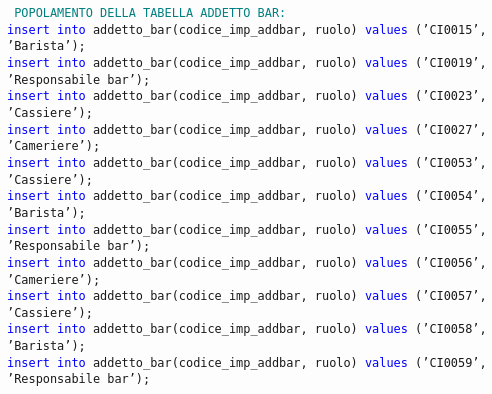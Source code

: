 \documentclass{article}
\begin{document}
    \begin{flushleft}
        \texttt{
        \textcolor{teal}{POPOLAMENTO DELLA TABELLA ADDETTO BAR:} \\
        \hspace*{0.5em}\textcolor{blue}{insert into} addetto\_bar(codice\_imp\_addbar, ruolo) \textcolor{blue}{values} ('CI0015', 'Barista'); \\
        \hspace*{0.5em}\textcolor{blue}{insert into} addetto\_bar(codice\_imp\_addbar, ruolo) \textcolor{blue}{values} ('CI0019', 'Responsabile \hspace*{0.5em}bar'); \\
        \hspace*{0.5em}\textcolor{blue}{insert into} addetto\_bar(codice\_imp\_addbar, ruolo) \textcolor{blue}{values} ('CI0023', 'Cassiere'); \\
        \hspace*{0.5em}\textcolor{blue}{insert into} addetto\_bar(codice\_imp\_addbar, ruolo) \textcolor{blue}{values} ('CI0027', 'Cameriere'); \\
        \hspace*{0.5em}\textcolor{blue}{insert into} addetto\_bar(codice\_imp\_addbar, ruolo) \textcolor{blue}{values} ('CI0053', 'Cassiere'); \\
        \hspace*{0.5em}\textcolor{blue}{insert into} addetto\_bar(codice\_imp\_addbar, ruolo) \textcolor{blue}{values} ('CI0054', 'Barista'); \\
        \hspace*{0.5em}\textcolor{blue}{insert into} addetto\_bar(codice\_imp\_addbar, ruolo) \textcolor{blue}{values} ('CI0055', 'Responsabile \hspace*{0.5em}bar'); \\
        \hspace*{0.5em}\textcolor{blue}{insert into} addetto\_bar(codice\_imp\_addbar, ruolo) \textcolor{blue}{values} ('CI0056', 'Cameriere'); \\
        \hspace*{0.5em}\textcolor{blue}{insert into} addetto\_bar(codice\_imp\_addbar, ruolo) \textcolor{blue}{values} ('CI0057', 'Cassiere'); \\
        \hspace*{0.5em}\textcolor{blue}{insert into} addetto\_bar(codice\_imp\_addbar, ruolo) \textcolor{blue}{values} ('CI0058', 'Barista'); \\
        \hspace*{0.5em}\textcolor{blue}{insert into} addetto\_bar(codice\_imp\_addbar, ruolo) \textcolor{blue}{values} ('CI0059', 'Responsabile \hspace*{0.5em}bar'); \\
}
\end{flushleft}
\end{document}
